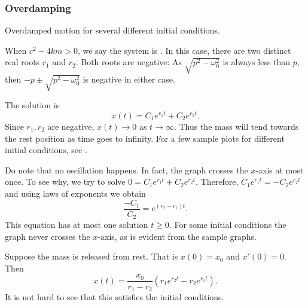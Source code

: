 \subsubsection{Overdamping}

\begin{mywrapfig}[15]{3.25in}
\capstart
{}
\caption{Overdamped motion for several different initial conditions.\label{mv:overdampedfig}}
\end{mywrapfig}
%
%

When
$c^2 - 4km > 0$, we say the system is \emph{}.  In this case,
there are two distinct real roots $r_1$ and $r_2$.  Both roots are
negative:  As $\sqrt{p^2 - \omega_0^2}$ is always less than $p$,
then
$-p \pm \sqrt{p^2 - \omega_0^2}$ is negative in either case.


The solution is
\begin{equation*}
x(t) = C_1 e^{r_1 t} + C_2 e^{r_2 t} .
\end{equation*}
Since $r_1, r_2$ are negative, $x(t) \to 0$ as $t \to \infty$.
Thus the mass will tend towards the rest position as
time goes to infinity.  For a few sample plots for different initial
conditions, see .


Do note that no oscillation happens.  In fact, the graph crosses the
$x$-axis at most once.  To see why, we try to solve
$0 = C_1 e^{r_1 t} + C_2 e^{r_2 t}$.
Therefore, $C_1 e^{r_1 t} = - C_2 e^{r_2 t}$ and using laws of exponents we
obtain
\begin{equation*}
\frac{-C_1}{C_2} = e^{(r_2-r_1) t} .
\end{equation*}
This equation has at most one solution $t \geq 0$.
For some initial conditions the graph never crosses the $x$-axis, as is
evident from the sample graphs.

\begin{example}
Suppose the mass is released from rest.  That is
$x(0) = x_0$ and $x'(0) = 0$.
Then
\begin{equation*}
x(t) = \frac{x_0}{r_1-r_2} \left(r_1 e^{r_2 t} - r_2 e^{r_1 t} \right) .
\end{equation*}
It is not hard to see that this satisfies the initial conditions.
\end{example}

